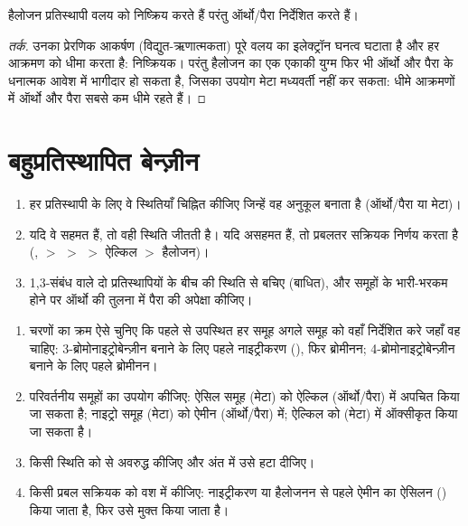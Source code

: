 \begin{proposition}[हैलोजन]\label{prop:b2:aromatic-substitution:halogens}
हैलोजन प्रतिस्थापी वलय को निष्क्रिय करते हैं परंतु ऑर्थो/पैरा निर्देशित करते हैं।
\end{proposition}

\begin{proof}[तर्क]
उनका प्रेरणिक आकर्षण (विद्युत-ऋणात्मकता) पूरे वलय का इलेक्ट्रॉन घनत्व घटाता है
और हर आक्रमण को धीमा करता है: निष्क्रियक। परंतु हैलोजन का एक एकाकी युग्म फिर भी ऑर्थो और पैरा
 के धनात्मक आवेश में भागीदार हो सकता है, जिसका उपयोग मेटा मध्यवर्ती नहीं
कर सकता: धीमे आक्रमणों में ऑर्थो और पैरा सबसे कम धीमे रहते हैं।
\end{proof}

\section{बहुप्रतिस्थापित बेन्ज़ीन}

\begin{method}[प्रतिस्थापन की स्थिति का पूर्वानुमान]\label{met:b2:aromatic-substitution:predict-position}
\begin{enumerate}
  \item हर प्रतिस्थापी के लिए वे स्थितियाँ चिह्नित कीजिए जिन्हें वह अनुकूल बनाता है (ऑर्थो/पैरा या मेटा)।
  \item यदि वे सहमत हैं, तो वही स्थिति जीतती है। यदि असहमत हैं, तो प्रबलतर सक्रियक निर्णय करता है
        (,  $>$  $>$  $>$ ऐल्किल $>$ हैलोजन)।
  \item 1,3-संबंध वाले दो प्रतिस्थापियों के बीच की स्थिति से बचिए (बाधित), और
        समूहों के भारी-भरकम होने पर ऑर्थो की तुलना में पैरा की अपेक्षा कीजिए।
\end{enumerate}
\end{method}

\begin{method}[ऐरोमैटिक संश्लेषण की योजना]\label{met:b2:aromatic-substitution:plan-aromatic}
\begin{enumerate}
  \item चरणों का क्रम ऐसे चुनिए कि पहले से उपस्थित हर समूह अगले समूह को
        वहाँ निर्देशित करे जहाँ वह चाहिए: 3-ब्रोमोनाइट्रोबेन्ज़ीन बनाने के लिए पहले नाइट्रीकरण (), फिर
        ब्रोमीनन; 4-ब्रोमोनाइट्रोबेन्ज़ीन बनाने के लिए पहले ब्रोमीनन।
  \item परिवर्तनीय समूहों का उपयोग कीजिए: ऐसिल समूह (मेटा) को ऐल्किल (ऑर्थो/पैरा) में अपचित किया जा सकता है;
        नाइट्रो समूह (मेटा) को ऐमीन (ऑर्थो/पैरा) में; ऐल्किल को
         (मेटा) में ऑक्सीकृत किया जा सकता है।
  \item किसी स्थिति को  से अवरुद्ध कीजिए और अंत में उसे हटा दीजिए।
  \item किसी प्रबल सक्रियक को वश में कीजिए: नाइट्रीकरण या हैलोजनन से पहले ऐमीन का ऐसिलन () किया जाता है,
        फिर उसे मुक्त किया जाता है।
\end{enumerate}
\end{method}

